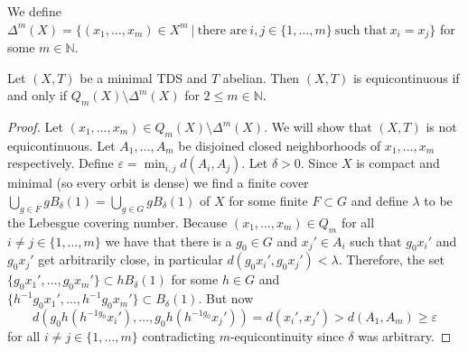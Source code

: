 We define $\Delta^m(X) = \{ (x_1, \dots, x_m) \in X^m \ | \ \text{there are} \ i, j \in \{1, \dots, m\} \ \text{such that} \ x_i = x_j \}$ for some $m \in \mathbb{N}$.

\begin{theorem}
	Let $(X, T)$ be a minimal TDS and $T$ abelian.
	Then $(X, T)$ is equicontinuous if and only if $Q_m(X) \setminus \Delta^m(X)$ for $2 \leq m \in \mathbb{N}$.
\end{theorem}

\begin{proof}
	Let $(x_1, \dots, x_m) \in Q_m(X) \setminus \Delta^m(X)$.
	We will show that $(X, T)$ is not equicontinuous.
	Let $A_1, \dots, A_m$ be disjoined closed neighborhoods of $x_1, \dots, x_m$ respectively.
	Define $\varepsilon = \min_{i, j} d(A_i, A_j)$.
	Let $\delta > 0$.
	Since $X$ is compact and minimal (so every orbit is dense) we find a finite cover $\bigcup_{g \in F} gB_\delta(1) = \bigcup_{g \in G} gB_\delta(1)$ of $X$ for some finite $F \subset G$
	and define $\lambda$ to be the Lebesgue covering number.
	Because $(x_1, \dots, x_m) \in Q_m$ for all $i \neq j \in \{1, \dots, m\}$ we have that there is a $g_0 \in G$ and $x_j' \in A_i$ such that $g_0x_i'$ and $g_0 x_j'$ get arbitrarily close, in particular $d(g_0 x_i', g_0 x_j') < \lambda$.
	Therefore, the set $\{ g_0x_1', \dots, g_0x_m' \} \subset hB_\delta(1)$ for some $h \in G$ and $\{ h^{-1}g_0x_1', \dots, h^{-1}g_0x_m' \} \subset B_\delta(1)$.
	But now
	\[ d(g_0h(h^{-1g_0}x_i'), \dots, g_0h(h^{-1g_0}x_j')) = d(x_i', x_j') > d(A_1, A_m) \geq \varepsilon \]
	for all $i \neq j \in \{1, \dots, m\}$ contradicting $m$-equicontinuity since $\delta$ was arbitrary.
 \end{proof}

